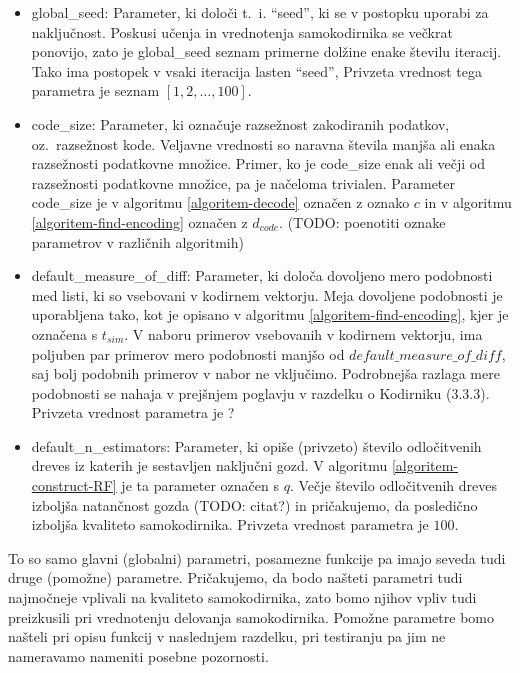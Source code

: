 \documentclass[12pt,a4paper]{article}
\begin{document}
\begin{itemize}
	\item global\_seed: Parameter, ki določi t.~i. ``seed'', ki se v postopku uporabi za naključnost.
	Poskusi učenja in vrednotenja samokodirnika se večkrat ponovijo, zato je global\_seed seznam primerne dolžine enake številu iteracij.
	Tako ima postopek v vsaki iteracija lasten ``seed'', Privzeta vrednost tega parametra je seznam $[1,2,\ldots,100]$.

	\item code\_size: Parameter, ki označuje razsežnost zakodiranih podatkov, oz.\ razsežnost kode. 
	Veljavne vrednosti so naravna števila manjša ali enaka razsežnosti podatkovne množice.
	Primer, ko je code\_size enak ali večji od razsežnosti podatkovne množice, pa je načeloma trivialen.
	Parameter code\_size je v algoritmu \ref{algoritem-decode} označen z oznako $c$ in v algoritmu \ref{algoritem-find-encoding} označen z $d_{code}$. 
	(TODO: poenotiti oznake parametrov v različnih algoritmih)
	
	\item default\_measure\_of\_diff: Parameter, ki določa dovoljeno mero podobnosti med listi, ki so vsebovani v kodirnem vektorju.
	Meja dovoljene podobnosti je uporabljena tako, kot je opisano v algoritmu \ref{algoritem-find-encoding}, kjer je označena s $t_{\mathit{sim}}$.
	V naboru primerov vsebovanih v kodirnem vektorju, ima poljuben par primerov mero podobnosti manjšo od $\mathit{default\_measure\_of\_diff}$, saj bolj podobnih primerov v nabor ne vključimo.
	Podrobnejša razlaga mere podobnosti se nahaja v prejšnjem poglavju v razdelku o Kodirniku (3.3.3). %
	Privzeta vrednost parametra je ? %

	\item default\_n\_estimators: Parameter, ki opiše (privzeto) število odločitvenih dreves iz katerih je sestavljen naključni gozd. 
	V algoritmu \ref{algoritem-construct-RF} je ta parameter označen s $q$. 
	Večje število odločitvenih dreves izboljša natančnost gozda (TODO: citat?) in pričakujemo, da posledično izboljša kvaliteto samokodirnika.
	Privzeta vrednost parametra je $100$.

\end{itemize}

To so samo glavni (globalni) parametri, posamezne funkcije pa imajo seveda tudi druge (pomožne) parametre.
Pričakujemo, da bodo našteti parametri tudi najmočneje vplivali na kvaliteto samokodirnika, zato bomo njihov vpliv tudi preizkusili pri vrednotenju delovanja samokodirnika. 
Pomožne parametre bomo našteli pri opisu funkcij v naslednjem razdelku, pri testiranju pa jim ne nameravamo nameniti posebne pozornosti.
\end{document}
